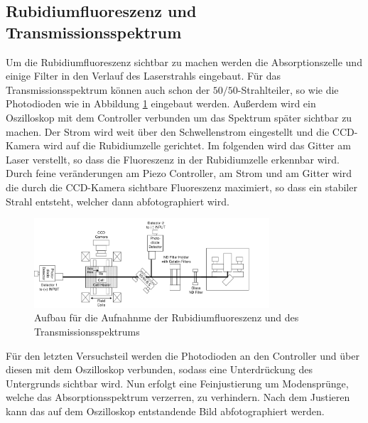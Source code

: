 \subsection{Rubidiumfluoreszenz und Transmissionsspektrum}
Um die Rubidiumfluoreszenz sichtbar zu machen werden die Absorptionszelle und einige Filter in den Verlauf des Laserstrahls eingebaut.
Für das Transmissionsspektrum können auch schon der $50 / 50$-Strahlteiler, so wie die Photodioden wie in Abbildung
\ref{pic:Absorptionsspektrum} eingebaut werden. Außerdem wird ein Oszilloskop mit dem Controller verbunden um das Spektrum später sichtbar zu machen.
Der Strom wird weit über den Schwellenstrom eingestellt und die CCD-Kamera wird auf die Rubidiumzelle gerichtet.
Im folgenden wird das Gitter am Laser verstellt, so dass die Fluoreszenz in der Rubidiumzelle
erkennbar wird. Durch feine veränderungen am Piezo Controller, am Strom und am Gitter wird die durch die CCD-Kamera
sichtbare Fluoreszenz maximiert, so dass ein stabiler Strahl entsteht, welcher dann abfotographiert wird.
\begin{figure}
    \centering
    \includegraphics[width = 0.78\textwidth]{pictures/Aufbau_abs.png}
    \caption{Aufbau für die Aufnahnme der Rubidiumfluoreszenz und des Transmissionsspektrums\cite{anleitung}}
    \label{pic:Absorptionsspektrum}
\end{figure}
Für den letzten Versuchsteil werden die Photodioden an den Controller und über diesen mit
dem Oszilloskop verbunden, sodass eine Unterdrückung des Untergrunds sichtbar wird. Nun erfolgt eine Feinjustierung um Modensprünge, welche das Absorptionsspektrum verzerren, zu verhindern.
Nach dem Justieren kann das auf dem Oszilloskop entstandende Bild abfotographiert werden.